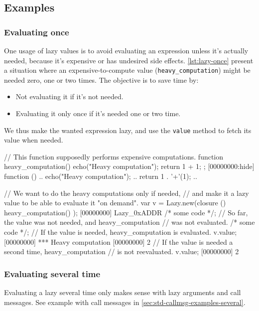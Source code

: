\subsection{Examples}

\subsubsection{Evaluating once}

One usage of lazy values is to avoid evaluating an expression unless
it's actually needed, because it's expensive or has undesired side
effects. \autoref{lst:lazy-once} present a situation where an
expensive-to-compute value (\lstinline|heavy_computation|) might be
needed zero, one or two times. The objective is to save time by:

\begin{itemize}
\item Not evaluating it if it's not needed.
\item Evaluating it only once if it's needed one or two time.
\end{itemize}

We thus make the wanted expression lazy, and use the \lstinline|value|
method to fetch its value when needed.

\begin{urbiscript}[caption=, label=lst:lazy-once, float=\floatpos]
// This function supposedly performs expensive computations.
function heavy_computation()
{
  echo("Heavy computation");
  return 1 + 1;
};
[00000000:hide] function () {
..  echo("Heavy computation");
..  return 1 . '+'(1);
..}

// We want to do the heavy computations only if needed,
// and make it a lazy value to be able to evaluate it "on demand".
var v = Lazy.new(closure () { heavy_computation() });
[00000000] Lazy_0xADDR
/* some code */;
// So far, the value was not needed, and heavy_computation
// was not evaluated.
/* some code */;
// If the value is needed, heavy_computation is evaluated.
v.value;
[00000000] *** Heavy computation
[00000000] 2
// If the value is needed a second time, heavy_computation
// is not reevaluated.
v.value;
[00000000] 2
\end{urbiscript}

\subsubsection{Evaluating several time}

Evaluating a lazy several time only makes sense with lazy arguments
and call messages. See example with call messages in
\autoref{sec:std-callmsg-examples-several}.

